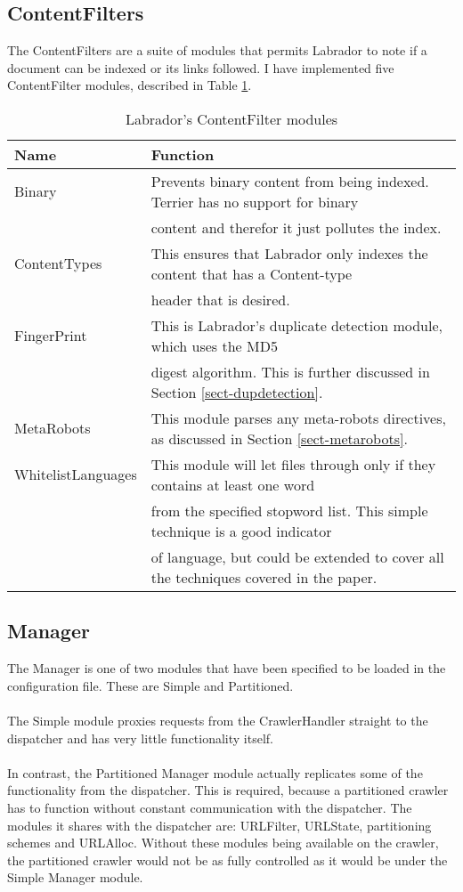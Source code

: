 \subsection{ContentFilters}
The ContentFilters are a suite of modules that permits Labrador to note if a document can be indexed or its links followed. I have implemented five ContentFilter modules, described in Table \ref{tbl-contentfilters}.
\begin{center}
\begin{table}
\begin{tabular}{|l|l|}
\hline
\bf{Name} & \bf{Function} \\
\hline
Binary & Prevents binary content from being indexed. Terrier has no support for binary \\
& content and therefor it just pollutes the index. \\
\hline
ContentTypes & This ensures that Labrador only indexes the content that has a Content-type\\
& header that is desired. \\
\hline
FingerPrint & This is Labrador's duplicate detection module, which uses the MD5\cite{rfc1321}\\
& digest algorithm. This is further discussed in Section \ref{sect-dupdetection}.\\
\hline
MetaRobots & This module parses any meta-robots directives, as discussed in Section \ref{sect-metarobots}.\\
\hline
WhitelistLanguages & This module will let files through only if they contains at least one word \\
& from the specified stopword list. This simple technique is a good indicator\cite{wechsler97multilanguage} \\ & of language, but could be extended to cover all the techniques covered in the paper.\\
\hline
\end{tabular}
\caption{Labrador's ContentFilter modules}\label{tbl-contentfilters}
\end{table}
\end{center}

\subsection{Manager}
The Manager is one of two modules that have been specified to be loaded in the configuration file. These are Simple and Partitioned. \\
\ \\
The Simple module proxies requests from the CrawlerHandler straight to the dispatcher and has very little functionality itself.\\
\ \\
In contrast, the Partitioned Manager module actually replicates some of the functionality from the dispatcher. This is required, because a partitioned crawler has to function without constant communication with the dispatcher. The modules it shares with the dispatcher are: URLFilter, URLState, partitioning schemes and URLAlloc. Without these modules being available on the crawler, the partitioned crawler would not be as fully controlled as it would be under the Simple Manager module.


